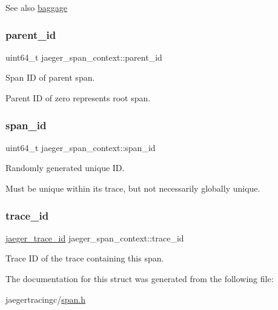 \begin{DoxySeeAlso}{See also}
\mbox{\hyperlink{structjaeger__span__context_aedfb64b810e041a807dd6e0ea8274215}{baggage}} 
\end{DoxySeeAlso}
\mbox{\label{structjaeger__span__context_a66ebaca50e8853b5fab9d4ebe82cfb32}} 
\subsubsection{\texorpdfstring{parent\+\_\+id}{parent\_id}}
{\footnotesize\ttfamily uint64\+\_\+t jaeger\+\_\+span\+\_\+context\+::parent\+\_\+id}



Span ID of parent span. 

Parent ID of zero represents root span. \mbox{\label{structjaeger__span__context_ad78982af52840b14a8bee7d3404755d3}} 
\subsubsection{\texorpdfstring{span\+\_\+id}{span\_id}}
{\footnotesize\ttfamily uint64\+\_\+t jaeger\+\_\+span\+\_\+context\+::span\+\_\+id}



Randomly generated unique ID. 

Must be unique within its trace, but not necessarily globally unique. \mbox{\label{structjaeger__span__context_aecace9cbf8c8432cb8c2f5d5dc65b994}} 
\subsubsection{\texorpdfstring{trace\+\_\+id}{trace\_id}}
{\footnotesize\ttfamily \mbox{\hyperlink{structjaeger__trace__id}{jaeger\+\_\+trace\+\_\+id}} jaeger\+\_\+span\+\_\+context\+::trace\+\_\+id}



Trace ID of the trace containing this span. 



The documentation for this struct was generated from the following file\+:\begin{DoxyCompactItemize}
\item 
jaegertracingc/\mbox{\hyperlink{span_8h}{span.\+h}}\end{DoxyCompactItemize}
